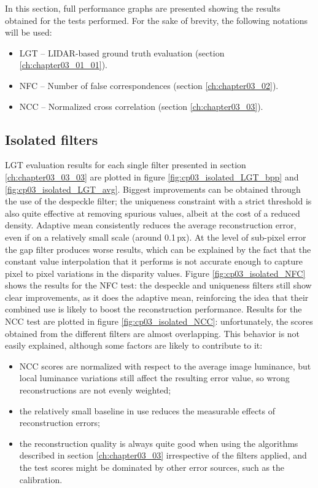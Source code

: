 In this section, full performance graphs are presented showing the results obtained for the tests performed. For the sake of brevity, the following notations will be used:
\begin{itemize}
 \item LGT – LIDAR-based ground truth evaluation (section \ref{ch:chapter03_01_01}).
 \item NFC – Number of false correspondences (section \ref{ch:chapter03_02}).
 \item NCC – Normalized cross correlation (section \ref{ch:chapter03_03}).
\end{itemize}

\subsection{Isolated filters}\label{ch:chapter03_04_01}

LGT evaluation results for each single filter presented in section \ref{ch:chapter03_03_03} are plotted in figure \ref{fig:cp03_isolated_LGT_bpp} and \ref{fig:cp03_isolated_LGT_avg}. Biggest improvements can be obtained through the use of the despeckle filter; the uniqueness constraint with a strict threshold is also quite effective at removing spurious values, albeit at the cost of a reduced density. Adaptive mean consistently reduces the average reconstruction error, even if on a relatively small scale (around 0.1\,px). At the level of sub-pixel error the gap filter produces worse results, which can be explained by the fact that the constant value interpolation that it performs is not accurate enough to capture pixel to pixel variations in the disparity values. Figure \ref{fig:cp03_isolated_NFC} shows the results for the NFC test: the despeckle and uniqueness filters still show clear improvements, as it does the adaptive mean, reinforcing the idea that their combined use is likely to boost the reconstruction performance. Results 
for 
the NCC test are plotted in figure \ref{fig:cp03_isolated_NCC}: unfortunately, the scores obtained from the different filters are almost overlapping. This behavior is not easily explained, although some factors are likely to contribute to it:
\begin{itemize}
 \item NCC scores are normalized with respect to the average image luminance, but local luminance variations still affect the resulting error value, so wrong reconstructions are not evenly weighted;
 \item the relatively small baseline in use reduces the measurable effects of reconstruction errors;
 \item the reconstruction quality is always quite good when using the algorithms described in section \ref{ch:chapter03_03} irrespective of the filters applied, and the test scores might be dominated by other error sources, such as the calibration.
\end{itemize}

